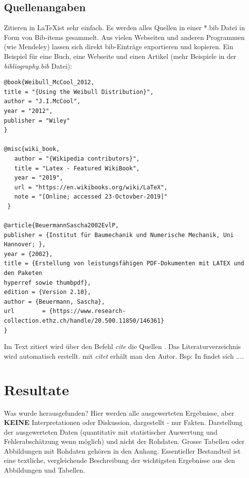 \section{Quellenangaben}
Zitieren in \LaTeX ist sehr einfach. Es werden alles Quellen in einer *.bib Datei in Form von Bib-items gesammelt. Aus vielen Webseiten und anderen Programmen (wie Mendeley) lassen sich direkt bib-Einträge exportieren und kopieren. Ein Beispiel für eine Buch, eine Webseite und einen Artikel (mehr Beispiele in der {\em bibliography.bib} Datei):
\begin{verbatim}
@book{Weibull_McCool_2012,
title = "{Using the Weibull Distribution}",
author = "J.I.McCool",
year = "2012",
publisher = "Wiley"
}

@misc{wiki_book,
   author = "{Wikipedia contributors}",
   title = "Latex - Featured WikiBook",
   year = "2019",
   url = "https://en.wikibooks.org/wiki/LaTeX",
   note = "[Online; accessed 23-Octovber-2019]"
 }

@article{BeuermannSascha2002EvlP,
publisher = {Institut für Baumechanik und Numerische Mechanik, Uni Hannover; },
year = {2002},
title = {Erstellung von leistungsfähigen PDF-Dokumenten mit LATEX und den Paketen 
hyperref sowie thumbpdf},
edition = {Version 2.10},
author = {Beuermann, Sascha},
url        = {https://www.research-collection.ethz.ch/handle/20.500.11850/146361}
}
\end{verbatim}
Im Text zitiert wird über den Befehl {\em cite} die Quellen \cite{Weibull_McCool_2012,wiki_book,BeuermannSascha2002EvlP,Leigh-Phoenix-Beyerlein_2000}. Das Literaturverzeichnis wird automatisch erstellt. mit {\em citet} erhält man den Autor. Bsp: In \citet{BeuermannSascha2002EvlP} findet sich ....

\chapter{Resultate}\label{chap:Resultate} 
Was wurde herausgefunden? Hier werden alle ausgewerteten Ergebnisse, aber \textbf{KEINE} Interpretationen oder Diskussion, dargestellt - nur Fakten. Darstellung der ausgewerteten Daten (quantitativ mit statistischer Auswertung und Fehlerabschätzung wenn möglich) und nicht der Rohdaten. Grosse Tabellen oder Abbildungen mit Rohdaten gehören in den Anhang. Essentieller Bestandteil ist eine textliche, vergleichende Beschreibung der wichtigsten Ergebnisse aus den Abbildungen und Tabellen.  
